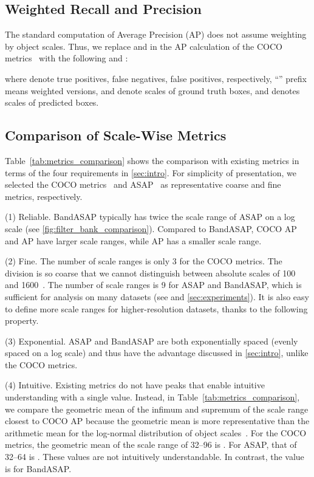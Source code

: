 \documentclass{mva_style}
\newcommand{\APS}{AP\xspace}
\newcommand{\APM}{AP\xspace}
\newcommand{\APL}{AP\xspace}
\begin{document}
\subsection{Weighted Recall and Precision}

The standard computation of Average Precision (AP) does not assume weighting by object scales.
Thus, we replace  and  in the AP calculation of the COCO metrics~\cite{cocoapi} with the following  and :





where  denote true positives, false negatives, false positives, respectively,
``'' prefix means weighted versions,
 and  denote scales of ground truth boxes,
and  denotes scales of predicted boxes.




\subsection{Comparison of Scale-Wise Metrics}

Table~\ref{tab:metrics_comparison} shows the comparison with existing metrics
in terms of the four requirements in \cref{sec:intro}.
For simplicity of presentation,
we selected the COCO metrics~\cite{COCO_ECCV2014, cocoapi} and ASAP~\cite{USB_Shinya_BMVC2022}
as representative coarse and fine metrics, respectively.

\noindent
(1) Reliable.
BandASAP typically has twice the scale range of ASAP on a log scale (see \cref{fig:filter_bank_comparison}).
Compared to BandASAP, COCO \APS and \APL have larger scale ranges,
while \APM has a smaller scale range.

\noindent
(2) Fine.
The number of scale ranges is only 3 for the COCO metrics.
The division is so coarse that we cannot distinguish between absolute scales of 100 and 1600~\cite{USB_Shinya_BMVC2022}.
The number of scale ranges is 9 for ASAP and BandASAP,
which is sufficient for analysis on many datasets (see \cite{USB_Shinya_BMVC2022} and \cref{sec:experiments}).
It is also easy to define more scale ranges for higher-resolution datasets,
thanks to the following property.

\noindent
(3) Exponential.
ASAP and BandASAP are both exponentially spaced (evenly spaced on a log scale)
and thus have the advantage discussed in \cref{sec:intro},
unlike the COCO metrics.

\noindent
(4) Intuitive.
Existing metrics do not have peaks that enable intuitive understanding with a single value.
Instead, in Table~\ref{tab:metrics_comparison},
we compare the geometric mean of the infimum and supremum of the scale range closest to COCO \APM
because the geometric mean is more representative than the arithmetic mean for the log-normal distribution of object scales~\cite{Caltech_PAMI2012}.
For the COCO metrics, the geometric mean of the scale range of 32--96 is .
For ASAP, that of 32--64 is .
These values are not intuitively understandable.
In contrast, the value is  for BandASAP.
\end{document}
